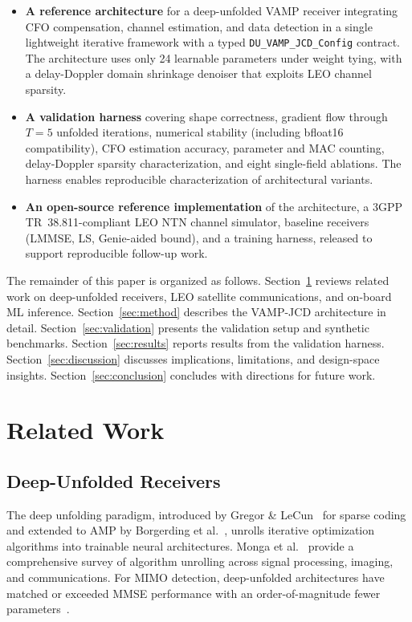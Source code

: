 \documentclass{article}
\begin{document}
\begin{itemize}
  \item \textbf{A reference architecture} for a deep-unfolded VAMP receiver integrating CFO compensation, channel estimation, and data detection in a single lightweight iterative framework with a typed \texttt{DU\_VAMP\_JCD\_Config} contract. The architecture uses only 24 learnable parameters under weight tying, with a delay-Doppler domain shrinkage denoiser that exploits LEO channel sparsity.
  \item \textbf{A validation harness} covering shape correctness, gradient flow through $T=5$ unfolded iterations, numerical stability (including bfloat16 compatibility), CFO estimation accuracy, parameter and MAC counting, delay-Doppler sparsity characterization, and eight single-field ablations. The harness enables reproducible characterization of architectural variants.
  \item \textbf{An open-source reference implementation} of the architecture, a 3GPP TR~38.811-compliant LEO NTN channel simulator, baseline receivers (LMMSE, LS, Genie-aided bound), and a training harness, released to support reproducible follow-up work.
\end{itemize}

The remainder of this paper is organized as follows. Section~\ref{sec:related} reviews related work on deep-unfolded receivers, LEO satellite communications, and on-board ML inference. Section~\ref{sec:method} describes the VAMP-JCD architecture in detail. Section~\ref{sec:validation} presents the validation setup and synthetic benchmarks. Section~\ref{sec:results} reports results from the validation harness. Section~\ref{sec:discussion} discusses implications, limitations, and design-space insights. Section~\ref{sec:conclusion} concludes with directions for future work.

\section{Related Work}
\label{sec:related}

\subsection{Deep-Unfolded Receivers}

The deep unfolding paradigm, introduced by Gregor \& LeCun~\cite{gregor2010learning} for sparse coding and extended to AMP by Borgerding et al.~\cite{borgerding2017amp}, unrolls iterative optimization algorithms into trainable neural architectures. Monga et al.~\cite{monga2021algorithm} provide a comprehensive survey of algorithm unrolling across signal processing, imaging, and communications. For MIMO detection, deep-unfolded architectures have matched or exceeded MMSE performance with an order-of-magnitude fewer parameters~\cite{he2018learning,samuel2014training}.
\end{document}
